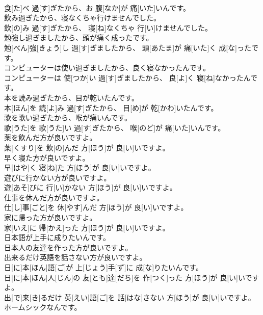 \documentclass[8pt]{extreport}
\begin{document}
\begin{CJK}{UTF8}{min}
\\	食[た]べ 過[す]ぎたから、お 腹[なか]が 痛[いた]いんです。
\\	飲み過ぎたから、寝なくちゃ行けませんでした。	
\\	飲[の]み 過[す]ぎたから、 寝[ね]なくちゃ 行[い]けませんでした。
\\	勉強し過ぎましたから、頭が痛く成ったです。	
\\	勉[べん]強[きょう]し 過[す]ぎましたから、 頭[あたま]が 痛[いた]く 成[な]ったです。
\\	コンピューターは使い過ぎましたから、良く寝なかったんです。	
\\	コンピューターは 使[つか]い 過[す]ぎましたから、 良[よ]く 寝[ね]なかったんです。
\\	本を読み過ぎたから、目が乾いたんです。	
\\	本[ほん]を 読[よ]み 過[す]ぎたから、 目[め]が 乾[かわ]いたんです。
\\	歌を歌い過ぎたから、喉が痛いんです。	
\\	歌[うた]を 歌[うた]い 過[す]ぎたから、 喉[のど]が 痛[いた]いんです。
\\	薬を飲んだ方が良いですよ。	
\\	薬[くすり]を 飲[の]んだ 方[ほう]が 良[い]いですよ。
\\	早く寝た方が良いですよ。	
\\	早[はや]く 寝[ね]た 方[ほう]が 良[い]いですよ。
\\	遊びに行かない方が良いですよ。	
\\	遊[あそ]びに 行[い]かない 方[ほう]が 良[い]いですよ。
\\	仕事を休んだ方が良いですよ。	
\\	仕[し]事[ごと]を 休[やす]んだ 方[ほう]が 良[い]いですよ。
\\	家に帰った方が良いですよ。	
\\	家[いえ]に 帰[かえ]った 方[ほう]が 良[い]いですよ。
\\	日本語が上手に成りたいんです。 
\\	日本人の友達を作った方が良いですよ。 
\\	出来るだけ英語を話さない方が良いですよ。	
\\	日[に]本[ほん]語[ご]が 上[じょう]手[ず]に 成[な]りたいんです。 
\\	日[に]本[ほん]人[じん]の 友[とも]達[だち]を 作[つく]った 方[ほう]が 良[い]いですよ。 
\\	出[で]来[き]るだけ 英[えい]語[ご]を 話[はな]さない 方[ほう]が 良[い]いですよ。
\\	ホームシックなんです。 

\end{CJK}
\end{document}
